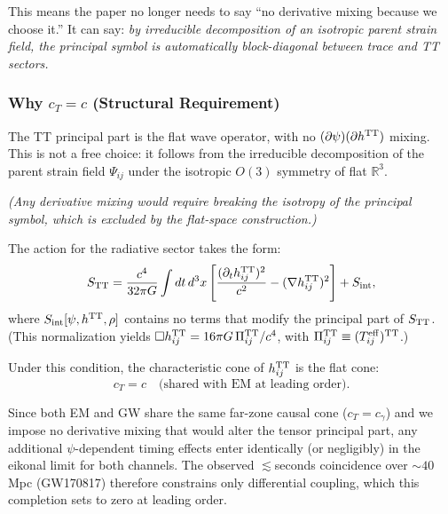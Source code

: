 This means the paper no longer needs to say ``no derivative mixing because we choose it.''  It can say: \emph{by irreducible decomposition of an isotropic parent strain field, the principal symbol is automatically block-diagonal between trace and TT sectors.}

\subsubsection{Why $c_T = c$ (Structural Requirement)}

\begin{tcolorbox}[colback=blue!5!white, colframe=blue!60!black, title=Radiative Sector: $O(3)$ Irrep Block-Diagonality]
The TT principal part is the flat wave operator, with no $(\partial\psi)(\partial h^{\rm TT})$ mixing.  This is not a free choice: it follows from the irreducible decomposition of the parent strain field $\Psi_{ij}$ under the isotropic $O(3)$ symmetry of flat $\mathbb{R}^3$.

\textit{(Any derivative mixing would require breaking the isotropy of the principal symbol, which is excluded by the flat-space construction.)}
\end{tcolorbox}

The action for the radiative sector takes the form:
\begin{equation}
S_{\rm TT} = \frac{c^4}{32\pi G}\int dt\,d^3x\left[\frac{(\partial_t h_{ij}^{\rm TT})^2}{c^2} - (\nabla h_{ij}^{\rm TT})^2\right] + S_{\rm int},
\end{equation}
where $S_{\rm int}[\psi, h^{\rm TT}, \rho]$ contains no terms that modify the principal part of $S_{\rm TT}$. (This normalization yields $\Box h_{ij}^{\rm TT} = 16\pi G\, \Pi_{ij}^{\rm TT}/c^4$, with $\Pi_{ij}^{\rm TT} \equiv (T_{ij}^{\rm eff})^{\rm TT}$.)

Under this condition, the characteristic cone of $h_{ij}^{\rm TT}$ is the flat cone:
\begin{equation}
c_T = c \quad \text{(shared with EM at leading order).}
\end{equation}

Since both EM and GW share the same far-zone causal cone ($c_T = c_\gamma$) and we impose no derivative mixing that would alter the tensor principal part, any additional $\psi$-dependent timing effects enter identically (or negligibly) in the eikonal limit for both channels. The observed $\lesssim$seconds coincidence over $\sim 40$ Mpc (GW170817) therefore constrains only differential coupling, which this completion sets to zero at leading order.

